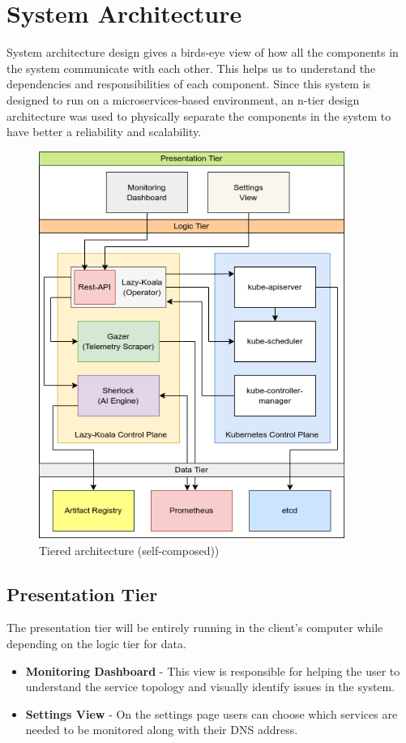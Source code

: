 \section{System Architecture}

System architecture design gives a birds-eye view of how all the components in the system communicate with each other. This helps us to understand the dependencies and responsibilities of each component. Since this system is designed to run on a microservices-based environment, an n-tier design architecture was used to physically separate the components in the system to have better a reliability and scalability.

\begin{figure}[H]
    \includegraphics[width=10cm]{assets/system-design/tier-architecture.png}
    \caption{Tiered architecture (self-composed))}
    \label{fig:tier-architecture}
\end{figure}

\subsection{Presentation Tier}

The presentation tier will be entirely running in the client's computer while depending on the logic tier for data.

\begin{itemize}[noitemsep,nolistsep] 
    \item \textbf{Monitoring Dashboard} - This view is responsible for helping the user to understand the service topology and visually identify issues in the system.
    \item \textbf{Settings View} - On the settings page users can choose which services are needed to be monitored along with their DNS address.
\end{itemize}


